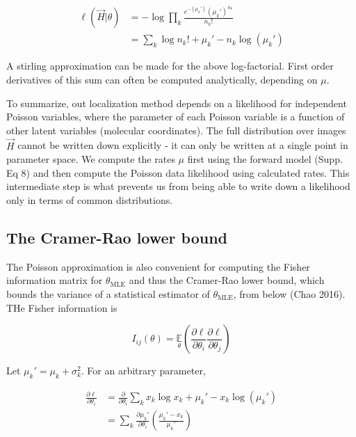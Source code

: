 \documentclass{ucetd}
\begin{document}
\begin{align}
\ell(\vec{H}|\theta) &= -\log \prod_{k} \frac{e^{-\left(\mu_{k}'\right)}\left(\mu_{k}'\right)^{n_{k}}}{n_{k}!}\\
&= \sum_{k}  \log n_{k}! + \mu_{k}' - n_{k}\log\left(\mu_{k}'\right)
\end{align}

A stirling approximation can be made for the above log-factorial. First order derivatives of this sum can often be computed analytically, depending on $\mu$. 

To summarize, out localization method depends on a likelihood for independent Poisson variables, where the parameter of each Poisson variable is a function of other latent variables (molecular coordinates). The full distribution over images $\vec{H}$ cannot be written down explicitly - it can only be written at a single point in parameter space. We compute the rates $\mu$ first using the forward model (Supp. Eq 8) and then compute the Poisson data likelihood using calculated rates. This intermediate step is what prevents us from being able to write down a likelihood only in terms of common distributions.

\subsection{The Cramer-Rao lower bound}

The Poisson approximation is also convenient for computing the Fisher information matrix for $\theta_{\mathrm{MLE}}$ and thus the Cramer-Rao lower bound, which bounds the variance of a statistical estimator of $\theta_{\mathrm{MLE}}$, from below (Chao 2016). THe Fisher information is

\begin{equation}
I_{ij}(\theta) = \underset{\theta}{\mathbb{E}}\left(\frac{\partial \ell}{\partial\theta_{i}}\frac{\partial\ell}{\partial\theta_{j}}\right) 
\end{equation}

Let $\mu_{k}' = \mu_{k} + \sigma_{k}^{2}$. For an arbitrary parameter,

\begin{align*}
\frac{\partial \ell}{\partial \theta_{i}} &= \frac{\partial}{\partial \theta_{i}} \sum_{k}  x_{k}\log x_{k} + \mu_{k}' - x_{k}\log\left(\mu_{k}'\right)\\
&= \sum_{k} \frac{\partial \mu_{k}'}{\partial\theta_{i}} \left(\frac{\mu_{k}'-x_{k}}{\mu_{k}'}\right)
\end{align*}
\end{document}
